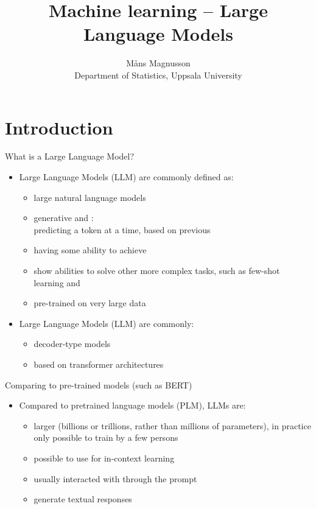 \documentclass[10pt]{beamer}
\title[]{{\color{black}Machine learning -- Large Language Models}}
\author[]{M{\aa}ns Magnusson\\Department of Statistics, Uppsala University}
\date{\currentsemester}
\begin{document}
\frame{\titlepage
}





\section{Introduction} %
\frame{\sectionpage}

\begin{frame}{What is a Large Language Model?}

\begin{itemize}
  \item Large Language Models (LLM) are commonly defined as:
  \begin{itemize}
      \item large natural language models
      \pause
      \item generative and :
      \\predicting a token at a time, based on previous 
      \pause
      \item having some ability to achieve 
      \item show  abilities to solve other more complex tasks, such as few-shot learning and 
      \pause
      \item pre-trained on very large data
  \end{itemize}
  \item Large Language Models (LLM) are commonly:
  \begin{itemize}
    \item decoder-type models
    \pause
    \item based on transformer architectures
  \end{itemize}
\end{itemize}

\end{frame}

\begin{frame}{Comparing to pre-trained models (such as BERT)}

\begin{itemize}
  \item Compared to pretrained language models (PLM), LLMs are:
  \begin{itemize}
      \item larger (billions or trillions, rather than millions of parameters), in practice only possible to train by a few persons\pause
      \item possible to use for in-context learning\pause
      \item usually interacted with through the prompt\pause
      \item generate textual responses
  \end{itemize}
\end{itemize}

\end{frame}
\end{document}
